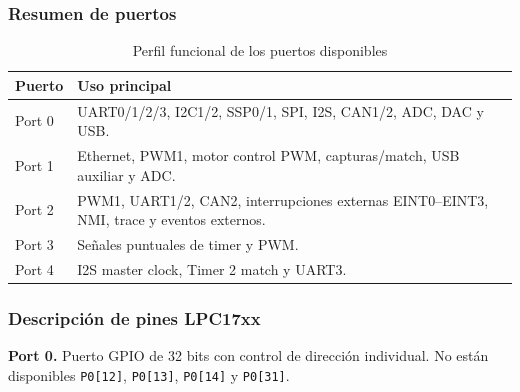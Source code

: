 ﻿\documentclass[11pt]{article}
\begin{document}
\subsubsection{Resumen de puertos}
\begin{table}[H]
  \centering
  \small
  \renewcommand{\arraystretch}{1.15}
  \caption{Perfil funcional de los puertos disponibles}
  \begin{tabularx}{\textwidth}{|>{\raggedright\arraybackslash}p{}|>{\raggedright\arraybackslash}X|}
    \hline
    \textbf{Puerto} & \textbf{Uso principal} \\
    \hline
    Port 0 & UART0/1/2/3, I2C1/2, SSP0/1, SPI, I2S, CAN1/2, ADC, DAC y USB. \\
    \hline
    Port 1 & Ethernet, PWM1, motor control PWM, capturas/match, USB auxiliar y ADC. \\
    \hline
    Port 2 & PWM1, UART1/2, CAN2, interrupciones externas EINT0--EINT3, NMI, trace y eventos externos. \\
    \hline
    Port 3 & Señales puntuales de timer y PWM. \\
    \hline
    Port 4 & I2S master clock, Timer 2 match y UART3. \\
    \hline
  \end{tabularx}
\end{table}

\subsubsection{Descripción de pines LPC17xx}
\noindent\textbf{Port 0.} Puerto GPIO de 32 bits con control de dirección individual. No están disponibles \texttt{P0[12]}, \texttt{P0[13]}, \texttt{P0[14]} y \texttt{P0[31]}.

\small
\renewcommand{\arraystretch}{1.15}
\setlength{\LTpre}{0pt}
\setlength{\LTpost}{8pt}
\end{document}
